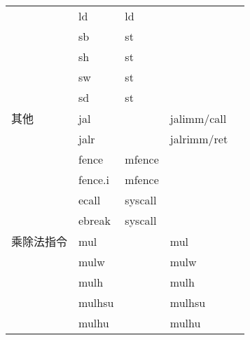 \begin{longtable}{lllll}
                                & ld                              & ld                             &     \\
                                & sb                              & st                             &     \\
                                & sh                              & st                             &     \\
                                & sw                              & st                             &     \\
                                & sd                              & st                             &     \\
    \hline
    其他                         & jal                              &                              & jalimm/call            \\
                               & jalr                             &                              & jalrimm/ret                 \\
                               & fence                            & mfence                       &                                \\
                               & fence.i                          & mfence                       &                                \\
                               & ecall                            & syscall                      &                                \\
                               & ebreak                           & syscall                      &                                \\
                               \hline
    乘除法指令                      & mul                              &                              & mul                            \\
                               & mulw                             &                              & mulw                           \\
                               & mulh                             &                              & mulh                           \\
                               & mulhsu                           &                              & mulhsu                         \\
                               & mulhu                            &                              & mulhu                          \\

\end{longtable}
